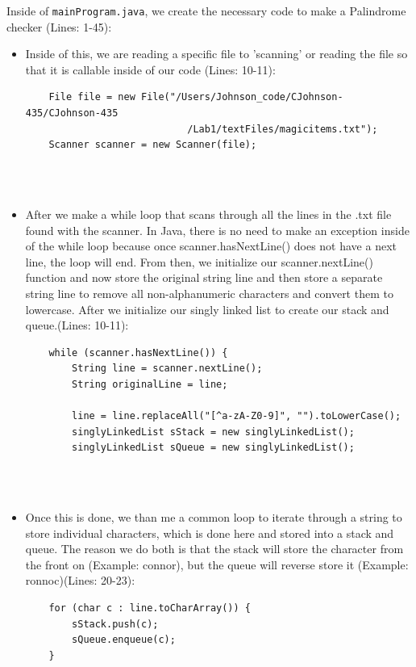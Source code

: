 \documentclass[a4paper,12pt]{article}
\begin{document}
\begin{itemize}
Inside of \verb|mainProgram.java|, we create the necessary code to make a Palindrome checker (Lines: 1-45):\\
\begin{itemize}
\item Inside of this, we are reading a specific file to 'scanning' or reading the file so that it is callable inside of our code (Lines: 10-11):

\begin{verbatim}
    File file = new File("/Users/Johnson_code/CJohnson-435/CJohnson-435
                            /Lab1/textFiles/magicitems.txt");
    Scanner scanner = new Scanner(file);


\end{verbatim}\\


\item After we make a while loop that scans through all the lines in the .txt file found with the scanner. In Java, there is no need to make an exception inside of the while loop because once scanner.hasNextLine() does not have a next line, the loop will end. From then, we initialize our scanner.nextLine() function and now store the original string line and then store a separate string line to remove all non-alphanumeric characters and convert them to lowercase. After we initialize our singly linked list to create our stack and queue.(Lines: 10-11):
\begin{verbatim}
    while (scanner.hasNextLine()) {
        String line = scanner.nextLine();
        String originalLine = line;  

        line = line.replaceAll("[^a-zA-Z0-9]", "").toLowerCase();
        singlyLinkedList sStack = new singlyLinkedList();
        singlyLinkedList sQueue = new singlyLinkedList();


\end{verbatim}\\

\item Once this is done, we than me a common loop to iterate through a string to store individual characters, which is done here and stored into a stack and queue. The reason we do both is that the stack will store the character from the front on (Example: connor), but the queue will reverse store it (Example: ronnoc)(Lines: 20-23):
\begin{verbatim}
    for (char c : line.toCharArray()) {
        sStack.push(c);
        sQueue.enqueue(c);
    }


\end{verbatim}\\


\end{itemize}
\end{itemize}
\end{document}
